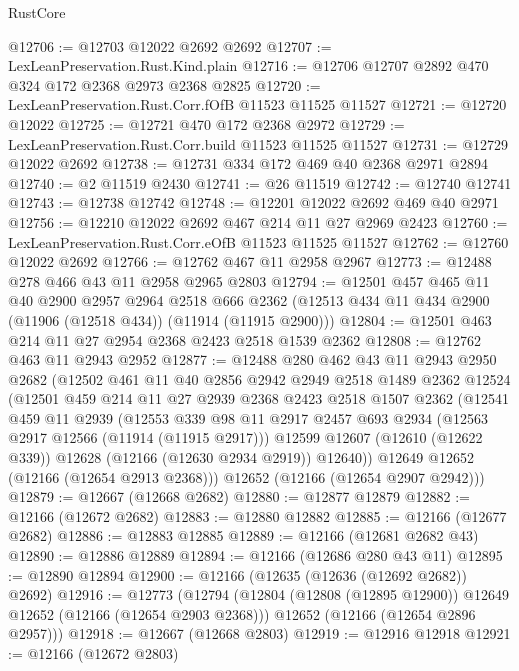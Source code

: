\begin{lexlean}{RustCore}
\begin{coremodule}
@12706 := @12703 @12022 @2692 @2692
@12707 := LexLeanPreservation.Rust.Kind.plain
@12716 := @12706 @12707 @2892 @470 @324 @172 @2368 @2973 @2368 @2825
@12720 := LexLeanPreservation.Rust.Corr.fOfB @11523 @11525 @11527
@12721 := @12720 @12022
@12725 := @12721 @470 @172 @2368 @2972
@12729 := LexLeanPreservation.Rust.Corr.build @11523 @11525 @11527
@12731 := @12729 @12022 @2692
@12738 := @12731 @334 @172 @469 @40 @2368 @2971 @2894
@12740 := @2 @11519 @2430
@12741 := @26 @11519
@12742 := @12740 @12741
@12743 := @12738 @12742
@12748 := @12201 @12022 @2692 @469 @40 @2971
@12756 := @12210 @12022 @2692 @467 @214 @11 @27 @2969 @2423
@12760 := LexLeanPreservation.Rust.Corr.eOfB @11523 @11525 @11527
@12762 := @12760 @12022 @2692
@12766 := @12762 @467 @11 @2958 @2967
@12773 := @12488 @278 @466 @43 @11 @2958 @2965 @2803
@12794 := @12501
    @457
    @465
    @11
    @40
    @2900
    @2957
    @2964
    @2518
    @666
    @2362
    (@12513 @434 @11 @434 @2900 (@11906 (@12518 @434)) (@11914 (@11915 @2900)))
@12804 := @12501 @463 @214 @11 @27 @2954 @2368 @2423 @2518 @1539 @2362
@12808 := @12762 @463 @11 @2943 @2952
@12877 := @12488
    @280
    @462
    @43
    @11
    @2943
    @2950
    @2682
    (@12502
      @461
      @11
      @40
      @2856
      @2942
      @2949
      @2518
      @1489
      @2362
      @12524
      (@12501
        @459
        @214
        @11
        @27
        @2939
        @2368
        @2423
        @2518
        @1507
        @2362
        (@12541
          @459
          @11
          @2939
          (@12553
            @339
            @98
            @11
            @2917
            @2457
            @693
            @2934
            (@12563 @2917 @12566 (@11914 (@11915 @2917)))
            @12599
            @12607
            (@12610 (@12622 @339))
            @12628
            (@12166 (@12630 @2934 @2919))
            @12640))
        @12649
        @12652
        (@12166 (@12654 @2913 @2368)))
      @12652
      (@12166 (@12654 @2907 @2942)))
@12879 := @12667 (@12668 @2682)
@12880 := @12877 @12879
@12882 := @12166 (@12672 @2682)
@12883 := @12880 @12882
@12885 := @12166 (@12677 @2682)
@12886 := @12883 @12885
@12889 := @12166 (@12681 @2682 @43)
@12890 := @12886 @12889
@12894 := @12166 (@12686 @280 @43 @11)
@12895 := @12890 @12894
@12900 := @12166 (@12635 (@12636 (@12692 @2682)) @2692)
@12916 := @12773
    (@12794
      (@12804 (@12808 (@12895 @12900)) @12649 @12652 (@12166 (@12654 @2903 @2368)))
      @12652
      (@12166 (@12654 @2896 @2957)))
@12918 := @12667 (@12668 @2803)
@12919 := @12916 @12918
@12921 := @12166 (@12672 @2803)

\end{coremodule}
\end{lexlean}

